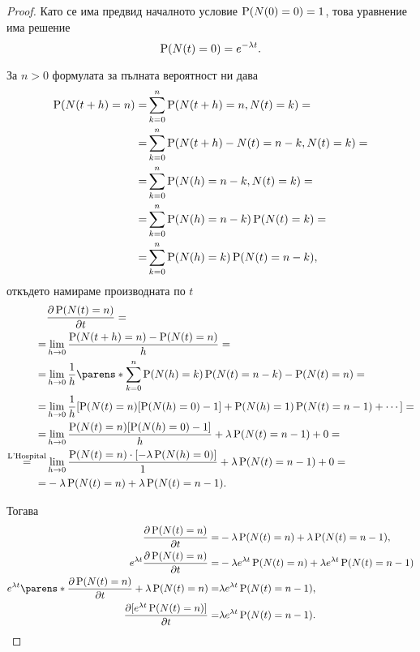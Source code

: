 \documentclass{../../common/topic}
\begin{document}
\begin{proof}
  Като се има предвид началното условие \( \operatorname{P}(N(0) = 0) = 1 \), това уравнение има решение
  \begin{equation*}
   \operatorname{P}(N(t) = 0) = e^{-\lambda t}.
  \end{equation*}

  За \( n > 0 \) формулата за пълната вероятност ни дава
  \begin{align*}
    \operatorname{P}(N(t+h) = n)
    =&
    \sum_{k=0}^n \operatorname{P}(N(t+h) = n, N(t) = k)
    = \\ =&
    \sum_{k=0}^n \operatorname{P}(N(t+h) - N(t) = n - k, N(t) = k)
    = \\ =&
    \sum_{k=0}^n \operatorname{P}(N(h) = n - k, N(t) = k)
    = \\ =&
    \sum_{k=0}^n \operatorname{P}(N(h) = n - k) \operatorname{P}(N(t) = k)
    = \\ =&
    \sum_{k=0}^n \operatorname{P}(N(h) = k) \operatorname{P}(N(t) = n - k),
  \end{align*}
  откъдето намираме производната по \( t \)
  \begin{align*}
    &\frac {\partial \Prob(N(t) = n)} {\partial t}
    = \\ =&
    \lim_{h \to 0} \frac {\Prob(N(t+h) = n) - \Prob(N(t) = n)} h
    = \\ =&
    \lim_{h \to 0} \frac 1 h \parens*{ \sum_{k=0}^n \Prob(N(h) = k) \Prob(N(t) = n - k) - \Prob(N(t) = n) }
    = \\ =&
    \lim_{h \to 0} \frac 1 h [\Prob(N(t) = n) [\Prob(N(h) = 0) - 1] + \Prob(N(h) = 1) \Prob(N(t) = n - 1) + \cdots]
    = \\ =&
    \lim_{h \to 0} \frac {\Prob(N(t) = n) [\Prob(N(h) = 0) - 1]} h + \lambda \Prob(N(t) = n - 1) + 0
    = \\ \overset {\text{L'Hospital}} =&
    \lim_{h \to 0} \frac {\Prob(N(t) = n) \cdot [-\lambda \Prob(N(h) = 0)]} 1 + \lambda \Prob(N(t) = n - 1) + 0
    = \\ =&
    -\lambda \Prob(N(t) = n) + \lambda \Prob(N(t) = n - 1).
  \end{align*}

  Тогава
  \begin{align*}
    \frac {\partial \Prob(N(t) = n)} {\partial t}
    =&
    -\lambda \Prob(N(t) = n) + \lambda \Prob(N(t) = n - 1),
    \\
    e^{\lambda t} \frac {\partial \Prob(N(t) = n)} {\partial t}
    =&
    -\lambda e^{\lambda t} \Prob(N(t) = n) + \lambda e^{\lambda t} \Prob(N(t) = n - 1)
    \\
    e^{\lambda t} \parens*{\frac {\partial \Prob(N(t) = n)} {\partial t} + \lambda \Prob(N(t) = n) }
    =&
    \lambda e^{\lambda t} \Prob(N(t) = n - 1),
    \\
    \frac {\partial [e^{\lambda t} \Prob(N(t) = n)]} {\partial t}
    =&
    \lambda e^{\lambda t} \Prob(N(t) = n - 1).
  \end{align*}


\end{proof}
\end{document}
